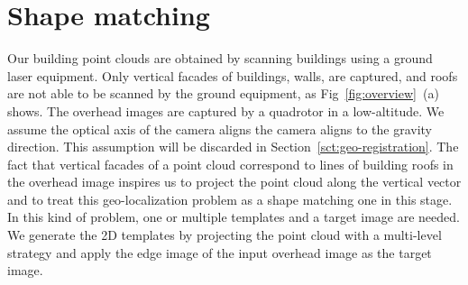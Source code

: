 \section{Shape matching}
%
Our building point clouds are obtained by scanning buildings using a ground laser equipment. Only vertical facades of buildings, walls, are captured, and roofs are not able to be scanned by the ground equipment, as Fig~\ref{fig:overview}~(a) shows. 
The overhead images are captured by a quadrotor in a low-altitude. We assume the optical axis of the camera aligns the camera aligns to the gravity direction. This assumption will be discarded in Section~\ref{sct:geo-registration}.
The fact that vertical facades of a point cloud correspond to lines of building roofs in the overhead image \cite{ECDM} inspires us to project the point cloud along the vertical vector and to treat this geo-localization  problem as a shape matching one in this stage. 
In this kind of problem, one or multiple templates and a target image are needed. 
We generate the 2D templates by projecting the point cloud with a multi-level strategy and apply the edge image of the input overhead image as the target image.

